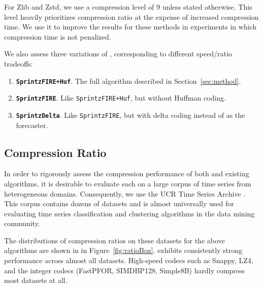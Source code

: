 For Zlib and Zstd, we use a compression level of 9 unless stated otherwise. This level heavily prioritizes compression ratio at the expense of increased compression time. We use it to improve the results for these methods in experiments in which compression time is not penalized.

We also assess three variations of \mine, corresponding to different speed/ratio tradeoffs:%
\begin{enumerate}
    \item \textbf{\texttt{SprintzFIRE+Huf}}. The full algorithm described in Section~\ref{sec:method}.
    \item \textbf{\texttt{SprintzFIRE}}. Like \texttt{SprintzFIRE+Huf}, but without Huffman coding.
    \item \textbf{\texttt{SprintzDelta}}. Like \texttt{SprintzFIRE}, but with delta coding instead of \fire as the forecaster.
\end{enumerate}



\subsection{Compression Ratio}

In order to rigorously assess the compression performance of both \minesp and existing algorithms, it is desirable to evaluate each on a large corpus of time series from heterogeneous domains. Consequently, we use the UCR Time Series Archive \cite{ucrTimeSeries}. This corpus contains dozens of datasets and is almost universally used for evaluating time series classification and clustering algorithms in the data mining community.

The distributions of compression ratios on these datasets for the above algorithms are shown in in Figure~\ref{fig:ratioBox}. \minesp exhibits consistently strong performance across almost all datasets. High-speed codecs such as Snappy, LZ4, and the integer codecs (FastPFOR, SIMDBP128, Simple8B) hardly compress most datasets at all.

